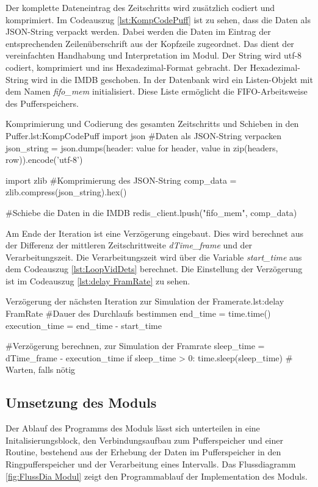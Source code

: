 Der komplette Dateneintrag des Zeitschritts wird zusätzlich codiert und komprimiert. Im Codeauszug \ref{lst:KompCodePuff} ist zu sehen, dass die Daten als JSON-String verpackt werden. Dabei werden die Daten im Eintrag der entsprechenden Zeilenüberschrift aus der Kopfzeile zugeordnet. Das dient der vereinfachten Handhabung und Interpretation im Modul. Der String wird utf-8 codiert, komprimiert und ins Hexadezimal-Format gebracht. Der Hexadezimal-String wird in die IMDB geschoben. In der Datenbank wird ein Listen-Objekt mit dem Namen \textit{fifo\_mem} initialisiert. Diese Liste ermöglicht die FIFO-Arbeitsweise des Pufferspeichers.

\begin{pythoncode}{Komprimierung und Codierung des gesamten Zeitschritts und Schieben in den Puffer.}{lst:KompCodePuff}
import json
#Daten als JSON-String verpacken
json_string = json.dumps({header: value for header, value in zip(headers, row)}).encode('utf-8')

import zlib
#Komprimierung des JSON-String 
comp_data = zlib.compress(json_string).hex()

#Schiebe die Daten in die IMDB
redis_client.lpush("fifo_mem", comp_data)
\end{pythoncode}

Am Ende der Iteration ist eine Verzögerung eingebaut. Dies wird berechnet aus der Differenz der mittleren Zeitschrittweite \textit{dTime\_frame} und der Verarbeitungszeit. Die Verarbeitungszeit wird über die Variable \textit{start\_time} aus dem Codeauszug \ref{lst:LoopVidDets} berechnet. Die Einstellung der Verzögerung ist im Codeauszug \ref{lst:delay FramRate} zu sehen.

\begin{pythoncode}{Verzögerung der nächsten Iteration zur  Simulation der Framerate.}{lst:delay FramRate}
#Dauer des Durchlaufs bestimmen 
end_time = time.time()
execution_time = end_time - start_time 

#Verzögerung berechnen, zur Simulation der Framrate
sleep_time = dTime_frame - execution_time 
if sleep_time > 0:
    time.sleep(sleep_time)  # Warten, falls nötig
\end{pythoncode}


\subsection{Umsetzung des Moduls}
Der Ablauf des Programms des Moduls lässt sich unterteilen in eine Initalisierungsblock, den Verbindungsaufbau zum Pufferspeicher und einer Routine, bestehend aus der Erhebung der Daten im Pufferspeicher in den Ringpufferspeicher und der Verarbeitung eines Intervalls. Das Flussdiagramm \ref{fig:FlussDia Modul} zeigt den Programmablauf der Implementation des Moduls. 

